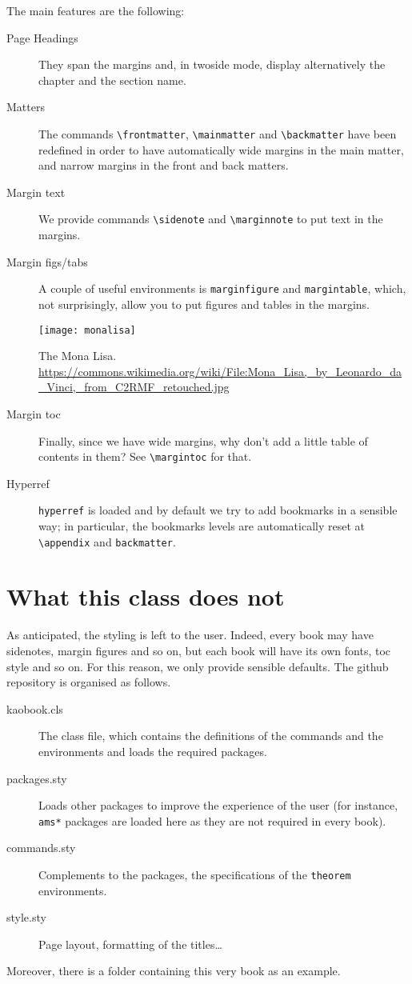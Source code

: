 The main features are the following:

\begin{description}
	\item[Page Headings] They span the margins and, in twoside mode, 
		display alternatively the chapter and the section name.
	\item[Matters] The commands \verb|\frontmatter|, \verb|\mainmatter| 
		and \verb|\backmatter| have been redefined in order to have 
		automatically wide margins in the main matter, and narrow 
		margins in the front and back matters.
	\item[Margin text] We provide commands \verb|\sidenote| and 
		\verb|\marginnote| to put text in the 
		margins.
	\item[Margin figs/tabs] A couple of useful environments is 
		\verb|marginfigure| and \verb|margintable|, which, not 
		surprisingly, allow you to put figures and tables in the 
		margins.
		\begin{marginfigure}[*-3]
			\texttt{[image: monalisa]}
			\caption{The Mona Lisa.\\
				\url{https://commons.wikimedia.org/wiki/File:Mona_Lisa,_by_Leonardo_da_Vinci,_from_C2RMF_retouched.jpg}}
		\end{marginfigure}
	\item[Margin toc] Finally, since we have wide margins, why don't add 
		a little table of contents in them? See \verb|\margintoc| for 
		that.
	\item[Hyperref] \verb|hyperref| is loaded and by default we try to 
		add bookmarks in a sensible way; in particular, the bookmarks 
		levels are automatically reset at \verb|\appendix| and 
		\verb|backmatter|.
\end{description}

\section{What this class does not}

As anticipated, the styling is left to the user. Indeed, every book may 
have sidenotes, margin figures and so on, but each book will have its 
own fonts, toc style and so on. For this reason, we only provide 
sensible defaults. The github repository is organised as follows.

\begin{description}
	\item[kaobook.cls] The class file, which contains the definitions of 
		the commands and the environments and loads the required 
		packages.
	\item[packages.sty] Loads other packages to improve the experience 
		of the user (for instance, \verb|ams*| packages are loaded here 
		as they are not required in every book).
	\item[commands.sty] Complements to the packages, \eg the 
		specifications of the \verb|theorem| environments.
	\item[style.sty] Page layout, formatting of the titles\ldots
\end{description}

Moreover, there is a folder containing this very book as an example.

